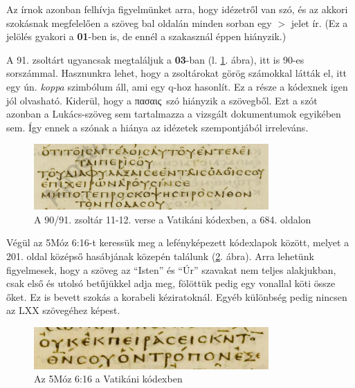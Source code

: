 \documentclass{article}
\newcommand\gr{\selectlanguage{greek}\frenchspacing}
\newcommand\hu{\selectlanguage{magyar}\frenchspacing}
\begin{document}
Az írnok azonban felhívja figyelmünket arra, hogy idézetről van szó, és az akkori
szokásnak megfelelően a szöveg bal oldalán minden sorban egy $>$ jelet ír. (Ez a jelölés
gyakori a \textbf{01}-ben is, de ennél a szakasznál éppen hiányzik.)

A 91. zsoltárt ugyancsak megtaláljuk a \textbf{03}-ban (l. \ref{03-Ps90:11-12}. ábra),
itt is 90-es sorszámmal. Hasznunkra
lehet, hogy a zsoltárokat görög számokkal látták el, itt egy ún. \textit{koppa} szimbólum áll, ami
egy q-hoz hasonlít. Ez a része a kódexnek igen jól olvasható. Kiderül, hogy a \gr πασαις\hu\ szó
hiányzik a szövegből. Ezt a szót azonban a Lukács-szöveg sem tartalmazza a vizsgált
dokumentumok egyikében sem. Így ennek a szónak a hiánya az idézetek szempontjából irreleváns.

\begin{figure}
\begin{center}
\includegraphics[width=0.8\textwidth]{../common/03_684lt-Ps90:11-12}
\caption{A 90/91. zsoltár 11-12. verse a Vatikáni kódexben, a 684. oldalon}
\label{03-Ps90:11-12}
\end{center}
\end{figure}

Végül az 5Móz 6:16-t keressük meg a lefényképezett kódexlapok között, melyet a 201. oldal
középső hasábjának közepén találunk (\ref{03-Deut6:16}. ábra). Arra lehetünk figyelmesek,
hogy a szöveg az ``Isten'' és ``Úr'' szavakat nem teljes alakjukban, csak első és utolsó
betűjükkel adja meg, fölöttük pedig egy vonallal köti össze őket. Ez is bevett szokás
a korabeli kéziratoknál. Egyéb különbség pedig nincsen az LXX szövegéhez képest.

\begin{figure}
\begin{center}
\includegraphics[width=0.8\textwidth]{../common/03_201mc-Deut6:16}
\caption{Az 5Móz 6:16 a Vatikáni kódexben}
\label{03-Deut6:16}
\end{center}
\end{figure}
\end{document}

